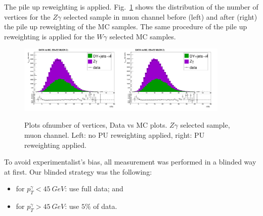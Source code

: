 The pile up reweighting is applied. Fig.~\ref{fig:DATAvsMC_nVtx} shows the distribution of the number of vertices for the $Z\gamma$ selected sample in muon channel before (left) and after (right) the pile up reweighting of the MC samples. The same procedure of the pile up reweighting is applied for the $W\gamma$ selected MC samples.

\begin{figure}[htb]
  \begin{center}
   \includegraphics[width=0.45\textwidth]{../figs/figs_v11/MUON_ZGamma/PrepareYields/c_TotalDATAvsMC_EtaCommon__nVtx_noPU.png}\includegraphics[width=0.45\textwidth]{../figs/figs_v11/MUON_ZGamma/PrepareYields/c_TotalDATAvsMC_EtaCommon__nVtx.png}
  \caption{Plots ofnumber of vertices, Data vs MC plots. $Z\gamma$ selected sample, muon channel. Left: no PU reweighting applied, right: PU reweighting applied. }
  \label{fig:DATAvsMC_nVtx}
  \end{center}
\end{figure}

To avoid experimentalist's bias, all measurement was performed in a blinded way at first. Our blinded strategy was the following:
\begin{itemize}
  \item for $p_T^{\gamma}<45~GeV$: use full data; and
  \item for $p_T^{\gamma}>45~GeV$: use $5\%$ of data.
\end{itemize}

